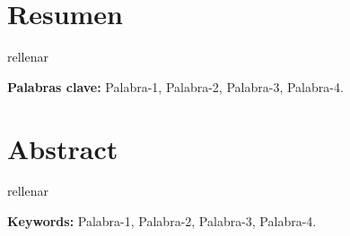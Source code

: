 \chapter*{Resumen}

rellenar

\textbf{Palabras clave:} Palabra-1, Palabra-2, Palabra-3, Palabra-4.

\chapter*{Abstract}

rellenar


\textbf{Keywords:} Palabra-1, Palabra-2, Palabra-3, Palabra-4.
